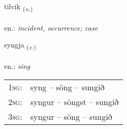 \documentclass[frontgrid, backgrid]{flacards}\usepackage[]{graphicx}\usepackage[]{xcolor}
\begin{document}
\renewcommand{\flhead}{\vskip5pt \fboxsep=0pt {\small\bfseries\footnotesize Nafnorð | Noun}}
\renewcommand{\fcfoot}{\vskip5pt \fboxsep=0pt \hspace{2pt}{\small\bfseries\footnotesize 1K}}

\renewcommand{\blhead}{\vskip5pt {\small\bfseries\footnotesize Nafnorð | Noun }}
\renewcommand{\bcfoot}{\vskip5pt \hspace{2pt}{\small\bfseries\footnotesize 1K}}


{tilvik \small{\textsubscript{(\textit{n.})}} \\[1ex] %
\textphonetic{[tʰɪlvɪk]} \\
en.: \emph{incident, occurrence; case} \\  [2ex]
\renewcommand*{\arraystretch}{0.8}
}

\renewcommand{\flhead}{\vskip5pt \fboxsep=0pt {\small\bfseries\footnotesize Sagnorð | Verb}}
\renewcommand{\fcfoot}{\vskip5pt \fboxsep=0pt \hspace{2pt}{\small\bfseries\footnotesize 1K}}

\renewcommand{\blhead}{\vskip5pt {\small\bfseries\footnotesize Sagnorð | Verb }}
\renewcommand{\bcfoot}{\vskip5pt \hspace{2pt}{\small\bfseries\footnotesize 1K}}


{syngja \small{\textsubscript{(\textit{v.})}} \\[1ex] %
\textphonetic{[siɲca]} \\
en.: \emph{sing} \\  [2ex]
\renewcommand*{\arraystretch}{0.8}
\begin{tabular}{p{1cm}l}
\textsc{1sg}: & syng -- söng -- sungið \\ 
\textsc{2sg}: & syngur -- söngst -- sungið \\ 
\textsc{3sg}: & syngur -- söng -- sungið \\ 
\end{tabular}
}
\end{document}
